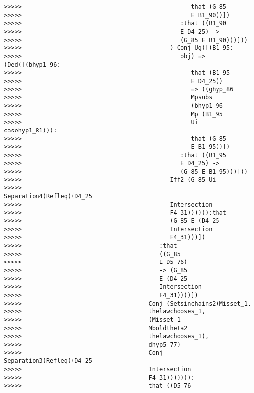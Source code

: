 \documentclass[12pt]{article}
\begin{document}
\begin{verbatim}
>>>>>                                                that (G_85
>>>>>                                                E B1_90))])
>>>>>                                             :that ((B1_90
>>>>>                                             E D4_25) ->
>>>>>                                             (G_85 E B1_90)))]))
>>>>>                                          ) Conj Ug([(B1_95:
>>>>>                                             obj) => (Ded([(bhyp1_96:
>>>>>                                                that (B1_95
>>>>>                                                E D4_25))
>>>>>                                                => ((ghyp_86
>>>>>                                                Mpsubs
>>>>>                                                (bhyp1_96
>>>>>                                                Mp (B1_95
>>>>>                                                Ui casehyp1_81))):
>>>>>                                                that (G_85
>>>>>                                                E B1_95))])
>>>>>                                             :that ((B1_95
>>>>>                                             E D4_25) ->
>>>>>                                             (G_85 E B1_95)))]))
>>>>>                                          Iff2 (G_85 Ui
>>>>>                                          Separation4(Refleq((D4_25
>>>>>                                          Intersection
>>>>>                                          F4_31)))))):that
>>>>>                                          (G_85 E (D4_25
>>>>>                                          Intersection
>>>>>                                          F4_31)))])
>>>>>                                       :that
>>>>>                                       ((G_85
>>>>>                                       E D5_76)
>>>>>                                       -> (G_85
>>>>>                                       E (D4_25
>>>>>                                       Intersection
>>>>>                                       F4_31))))])
>>>>>                                    Conj (Setsinchains2(Misset_1,
>>>>>                                    thelawchooses_1,
>>>>>                                    (Misset_1
>>>>>                                    Mboldtheta2
>>>>>                                    thelawchooses_1),
>>>>>                                    dhyp5_77)
>>>>>                                    Conj Separation3(Refleq((D4_25
>>>>>                                    Intersection
>>>>>                                    F4_31))))))):
>>>>>                                    that ((D5_76

\end{verbatim}
\end{document}
